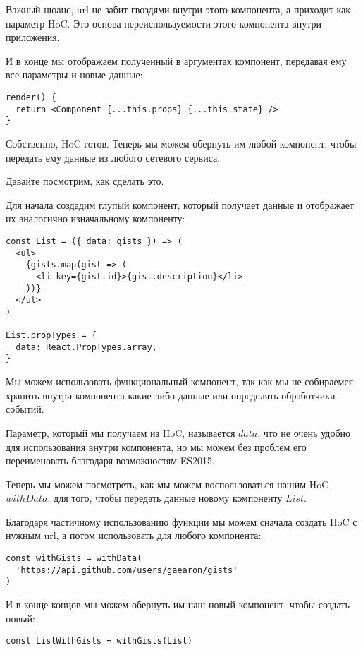 Важный нюанс, url не забит гвоздями внутри этого компонента, а приходит как параметр HoC. Это основа переиспользуемости этого компонента внутри приложения.

И в конце мы отображаем полученный в аргументах компонент, передавая ему все параметры и новые данные:

\begin{lstlisting}
render() {
  return <Component {...this.props} {...this.state} />
}
\end{lstlisting} 

Собственно, HoC готов. Теперь мы можем обернуть им любой компонент, чтобы передать ему данные из любого сетевого сервиса.

Давайте посмотрим, как сделать это.

Для начала создадим глупый компонент, который получает данные  и отображает их аналогично изначальному компоненту:

\begin{lstlisting}
const List = ({ data: gists }) => (
  <ul>
    {gists.map(gist => (
      <li key={gist.id}>{gist.description}</li>
    ))} 
  </ul>
)

List.propTypes = {
  data: React.PropTypes.array,
}
\end{lstlisting}

Мы можем использовать функциональный компонент, так как мы не собираемся хранить внутри компонента какие-либо данные или определять обработчики событий.

Параметр, который мы получаем из HoC, называется $data$, что не очень удобно для использования внутри компонента, но мы можем без проблем его переименовать благодаря возможностям ES2015.

Теперь мы можем посмотреть, как мы можем воспользоваться нашим HoC $withData$, для того, чтобы передать данные новому компоненту $List$.

Благодаря частичному использованию функции мы можем сначала создать HoC с нужным url, а потом использовать для любого компонента:

\begin{lstlisting}
const withGists = withData(
  'https://api.github.com/users/gaearon/gists'
)
\end{lstlisting}

И в конце концов мы можем обернуть им наш новый компонент, чтобы создать новый:

\begin{lstlisting}
const ListWithGists = withGists(List)
\end{lstlisting}

